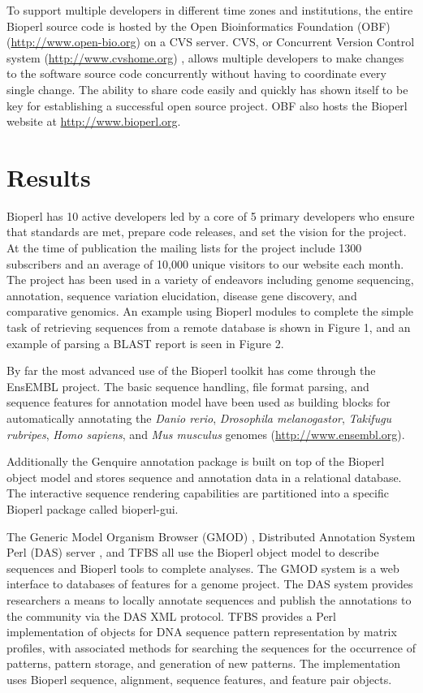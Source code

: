\documentclass[12pt]{article}
\begin{document}
To support multiple developers in different time zones and
institutions, the entire Bioperl source code is hosted by the Open
Bioinformatics Foundation (OBF) (\url{http://www.open-bio.org}) on a
CVS server.  CVS, or Concurrent Version Control system
(\url{http://www.cvshome.org}) \cite{cvsbook}, allows multiple
developers to make changes to the software source code concurrently
without having to coordinate every single change.  The ability to
share code easily and quickly has shown itself to be key for
establishing a successful open source project.  OBF also hosts the
Bioperl website at \url{http://www.bioperl.org}.

\section{Results}

Bioperl has 10 active developers led by a core of 5 primary developers
who ensure that standards are met, prepare code releases, and set the
vision for the project.  At the time of publication the mailing lists
for the project include 1300 subscribers and an average of 10,000
unique visitors to our website each month.  The project has been used
in a variety of endeavors including genome sequencing, annotation,
sequence variation elucidation, disease gene discovery, and
comparative genomics.  An example using Bioperl modules to complete
the simple task of retrieving sequences from a remote database is
shown in Figure 1, and an example of parsing a BLAST report is
seen in Figure 2.

By far the most advanced use of the Bioperl toolkit has come through
the EnsEMBL \cite{ensembl-nar} project.  The basic sequence handling,
file format parsing, and sequence features for annotation model have
been used as building blocks for automatically annotating the
\textit{Danio rerio}, \textit{Drosophila melanogastor},
\textit{Takifugu rubripes}, \textit{Homo sapiens}, and \textit{Mus
musculus} genomes (\url{http://www.ensembl.org}).

Additionally the Genquire \cite{genquire} annotation package is built
on top of the Bioperl object model and stores sequence and annotation
data in a relational database.  The interactive sequence rendering
capabilities are partitioned into a specific Bioperl package called
bioperl-gui.

The Generic Model Organism Browser (GMOD) \cite{gmod}, Distributed
Annotation System Perl (DAS) server \cite{das}, and TFBS
\cite{tfbs} all use the Bioperl object model to describe sequences and
Bioperl tools to complete analyses.  The GMOD system is a web
interface to databases of features for a genome project.  The DAS
system provides researchers a means to locally annotate sequences and
publish the annotations to the community via the DAS XML protocol.
TFBS provides a Perl implementation of objects for DNA sequence pattern
representation by matrix profiles, with associated methods for searching
the sequences for the occurrence of patterns, pattern storage, and
generation of new patterns. The implementation uses Bioperl sequence,
alignment, sequence features, and feature pair objects.
\end{document}

